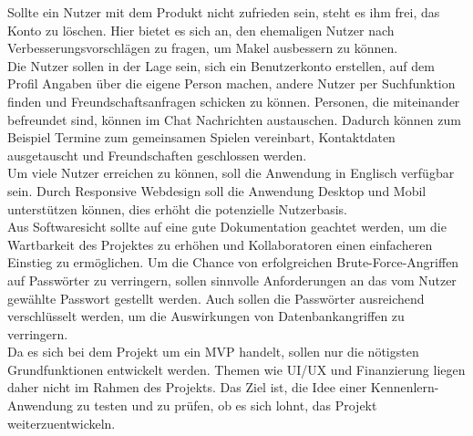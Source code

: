 Sollte ein Nutzer mit dem Produkt nicht zufrieden sein, steht es ihm frei, das Konto zu löschen.
Hier bietet es sich an, den ehemaligen Nutzer nach Verbesserungsvorschlägen zu fragen, um Makel ausbessern zu können.\\

Die Nutzer sollen in der Lage sein, sich ein Benutzerkonto erstellen, auf dem Profil Angaben über die eigene Person machen, andere Nutzer per Suchfunktion finden und Freundschaftsanfragen schicken zu können.
Personen, die miteinander befreundet sind, können im Chat Nachrichten austauschen.
Dadurch können zum Beispiel Termine zum gemeinsamen Spielen vereinbart, Kontaktdaten ausgetauscht und Freundschaften geschlossen werden.\\


Um viele Nutzer erreichen zu können, soll die Anwendung in Englisch verfügbar sein.
Durch  \gls{Responsive Webdesign}
soll die Anwendung Desktop und Mobil unterstützen können, dies erhöht die potenzielle Nutzerbasis.\\

Aus Softwaresicht sollte auf eine gute Dokumentation geachtet werden, um die Wartbarkeit des Projektes zu erhöhen und Kollaboratoren einen einfacheren Einstieg zu ermöglichen.
Um die Chance von erfolgreichen Brute-Force-Angriffen auf Passwörter zu verringern, sollen sinnvolle Anforderungen an das vom Nutzer gewählte Passwort gestellt werden.
Auch sollen die Passwörter ausreichend verschlüsselt werden, um die Auswirkungen von Datenbankangriffen zu verringern.\\

Da es sich bei dem Projekt um ein MVP handelt, sollen nur die nötigsten Grundfunktionen entwickelt werden.
Themen wie UI/UX und Finanzierung liegen daher nicht im Rahmen des Projekts.
Das Ziel ist, die Idee einer Kennenlern-Anwendung zu testen und zu prüfen, ob es sich lohnt, das Projekt weiterzuentwickeln. 